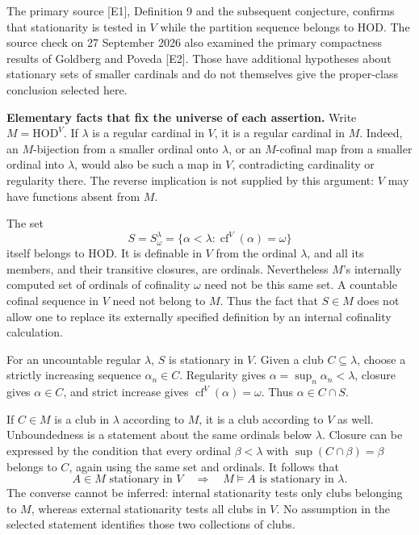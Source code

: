 \documentclass[11pt]{article}
\begin{document}
The primary source [E1], Definition 9 and the subsequent conjecture, confirms that stationarity is tested in $V$ while the partition sequence belongs to HOD. The source check on 27 September 2026 also examined the primary compactness results of Goldberg and Poveda [E2]. Those have additional hypotheses about stationary sets of smaller cardinals and do not themselves give the proper-class conclusion selected here.

\textbf{Elementary facts that fix the universe of each assertion.} Write $M=\mathrm{HOD}^V$. If $\lambda$ is a regular cardinal in $V$, it is a regular cardinal in $M$. Indeed, an $M$-bijection from a smaller ordinal onto $\lambda$, or an $M$-cofinal map from a smaller ordinal into $\lambda$, would also be such a map in $V$, contradicting cardinality or regularity there. The reverse implication is not supplied by this argument: $V$ may have functions absent from $M$.

The set
\[
 S=S^\lambda_\omega=\{\alpha<\lambda:\operatorname{cf}^V(\alpha)=\omega\}
\]
itself belongs to HOD. It is definable in $V$ from the ordinal $\lambda$, and all its members, and their transitive closures, are ordinals. Nevertheless $M$'s internally computed set of ordinals of cofinality $\omega$ need not be this same set. A countable cofinal sequence in $V$ need not belong to $M$. Thus the fact that $S\in M$ does not allow one to replace its externally specified definition by an internal cofinality calculation.

For an uncountable regular $\lambda$, $S$ is stationary in $V$. Given a club $C\subseteq\lambda$, choose a strictly increasing sequence $\alpha_n\in C$. Regularity gives $\alpha=\sup_n\alpha_n<\lambda$, closure gives $\alpha\in C$, and strict increase gives $\operatorname{cf}^V(\alpha)=\omega$. Thus $\alpha\in C\cap S$.

If $C\in M$ is a club in $\lambda$ according to $M$, it is a club according to $V$ as well. Unboundedness is a statement about the same ordinals below $\lambda$. Closure can be expressed by the condition that every ordinal $\beta<\lambda$ with $\sup(C\cap\beta)=\beta$ belongs to $C$, again using the same set and ordinals. It follows that
\[
 A\in M\text{ stationary in }V
 \quad\Longrightarrow\quad M\models\text{$A$ is stationary in $\lambda$}.
 \tag{303.1}
\]
The converse cannot be inferred: internal stationarity tests only clubs belonging to $M$, whereas external stationarity tests all clubs in $V$. No assumption in the selected statement identifies those two collections of clubs.
\end{document}

